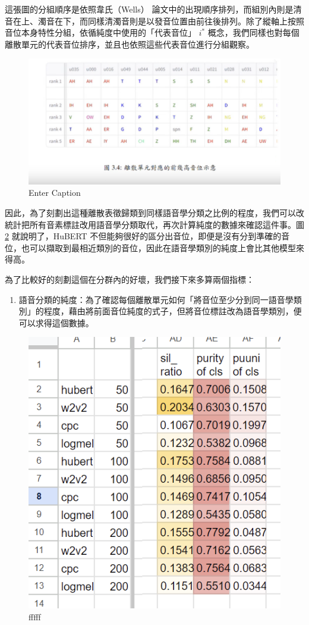 {        這張圖的分組順序是依照韋氏（Wells） \cite{wells_phonetic_2022} 論文中的出現順序排列，而組別內則是清音在上、濁音在下，而同樣清濁音則是以發音位置由前往後排列。除了縱軸上按照音位本身特性分組，依循純度中使用的「代表音位」 $i^\ast$ 概念，我們同樣也對每個離散單元的代表音位排序，並且也依照這些代表音位進行分組觀察。



\begin{figure}
    \centering
    \includegraphics[width=0.5\linewidth]{figures/fff.png}
    \caption{Enter Caption}
    \label{fig:enter-labfffel}
\end{figure}

        因此，為了刻劃出這種離散表徵歸類到同樣語音學分類之比例的程度，我們可以改統計把所有音素標註改用語音學分類取代，再次計算純度的數據來確認這件事。圖 \ref{ffffff} 就說明了，HuBERT 不但能夠很好的區分出音位，即便是沒有分到準確的音位，也可以擷取到最相近類別的音位，因此在語音學類別的純度上會比其他模型來得高。

        
        為了比較好的刻劃這個在分群內的好壞，我們接下來多算兩個指標：\par
\begin{enumerate}
    \item 語音分類的純度：為了確認每個離散單元如何「將音位至少分到同一語音學類別」的程度，藉由將前面音位純度的式子，但將音位標註改為語音學類別，便可以求得這個數據。
\end{enumerate}



\begin{figure}
    \centering
    \includegraphics[width=0.5\linewidth]{figures/ffff.png}
    \caption{fffff}
    \label{ffffff}
\end{figure}

}


